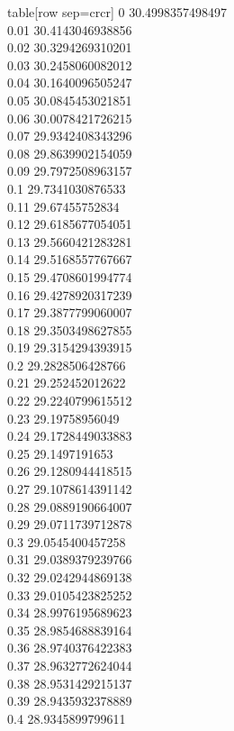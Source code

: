   table[row sep=crcr]{%
0	30.4998357498497\\
0.01	30.4143046938856\\
0.02	30.3294269310201\\
0.03	30.2458060082012\\
0.04	30.1640096505247\\
0.05	30.0845453021851\\
0.06	30.0078421726215\\
0.07	29.9342408343296\\
0.08	29.8639902154059\\
0.09	29.7972508963157\\
0.1	29.7341030876533\\
0.11	29.67455752834\\
0.12	29.6185677054051\\
0.13	29.5660421283281\\
0.14	29.5168557767667\\
0.15	29.4708601994774\\
0.16	29.4278920317239\\
0.17	29.3877799060007\\
0.18	29.3503498627855\\
0.19	29.3154294393915\\
0.2	29.2828506428766\\
0.21	29.252452012622\\
0.22	29.2240799615512\\
0.23	29.19758956049\\
0.24	29.1728449033883\\
0.25	29.1497191653\\
0.26	29.1280944418515\\
0.27	29.1078614391142\\
0.28	29.0889190664007\\
0.29	29.0711739712878\\
0.3	29.0545400457258\\
0.31	29.0389379239766\\
0.32	29.0242944869138\\
0.33	29.0105423825252\\
0.34	28.9976195689623\\
0.35	28.9854688839164\\
0.36	28.9740376422383\\
0.37	28.9632772624044\\
0.38	28.9531429215137\\
0.39	28.9435932378889\\
0.4	28.9345899799611\\
}
